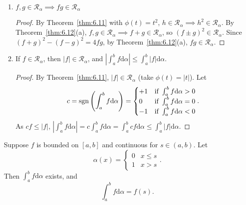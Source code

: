 \begin{thm}[13]
	\begin{enumerate}
		\item $f,g \in \mathscr{R}_{\alpha}\implies fg \in \mathscr{R}_{\alpha}$
		      \begin{proof}
			      By Theorem~\ref{thm:6.11} with $\phi(t)=t^2$, $h \in \mathscr{R}_{\alpha}\implies h^2 \in \mathscr{R}_{\alpha}$.
			      By Theorem~\ref{thm:6.12}(a), $f,g \in \mathscr{R}_{\alpha}\implies f+g \in \mathscr{R}_{\alpha}$, so $(f\pm g)^2 \in \mathscr{R}_{\alpha}$.
			      Since $(f+g)^2-(f-g)^2=4fg$, by Theorem~\ref{thm:6.12}(a), $fg \in \mathscr{R}_{\alpha}$.
		      \end{proof}
		\item If $f \in \mathscr{R}_{\alpha}$, then $|f| \in \mathscr{R}_{\alpha}$, and $\left|\int_{a}^{b}{f\mathrm{d}\alpha}\right|\le \int_{a}^{b}{|f|\mathrm{d}\alpha}$.
		      \begin{proof}
			      By Theorem~\ref{thm:6.11}, $|f| \in \mathscr{R}_{\alpha}$ (take $\phi(t)=|t|$).
			      Let \[
				      c=\operatorname{sgn}\left( \int_{a}^{b}{f\mathrm{d}\alpha}\right)=
				      \begin{cases}
					      +1 & \text{if } \int_{a}^{b}{f\mathrm{d}\alpha}>0 \\
					      0  & \text{if } \int_{a}^{b}{f\mathrm{d}\alpha}=0 \\
					      -1 & \text{if } \int_{a}^{b}{f\mathrm{d}\alpha}<0
				      \end{cases}
				      .\]
			      As $cf\le |f|$,
			      $\left|   \int_{a}^{b}{f\mathrm{d}\alpha}\right|=c\int_{a}^{b}{f\mathrm{d}\alpha}=\int_{a}^{b}{cf\mathrm{d}\alpha}\le \int_{a}^{b}{|f|\mathrm{d}\alpha}$.
		      \end{proof}
	\end{enumerate}

\end{thm}
\begin{thm}[15]
	Suppose $f$ is bounded on $[a,b]$ and continuous for $s \in (a,b)$.
	Let \[
		\alpha(x)=\begin{cases}
			0 & x\le s \\
			1 & x>s
		\end{cases}
		.\]
	Then $\int_{a}^{b}{f\mathrm{d}\alpha}$ exists, and
	\[
		\int_{a}^{b}{f\mathrm{d}\alpha}=f (s).
	\]
\end{thm}


